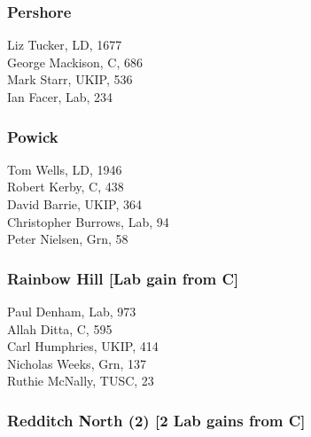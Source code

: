 \documentclass[a4paper,openany,10pt]{book}
\begin{document}
\subsubsection*{Pershore}



Liz Tucker, LD, 1677\\
George Mackison, C, 686\\
Mark Starr, UKIP, 536\\
Ian Facer, Lab, 234\\


\subsubsection*{Powick}



Tom Wells, LD, 1946\\
Robert Kerby, C, 438\\
David Barrie, UKIP, 364\\
Christopher Burrows, Lab, 94\\
Peter Nielsen, Grn, 58\\


\subsubsection*{Rainbow Hill \hspace*{\fill}\nolinebreak[1]%
\enspace\hspace*{\fill}
[Lab gain from C]}



Paul Denham, Lab, 973\\
Allah Ditta, C, 595\\
Carl Humphries, UKIP, 414\\
Nicholas Weeks, Grn, 137\\
Ruthie McNally, TUSC, 23\\


\subsubsection*{Redditch North (2) \hspace*{\fill}\nolinebreak[1]%
\enspace\hspace*{\fill}
[2 Lab gains from C]}
\end{document}
